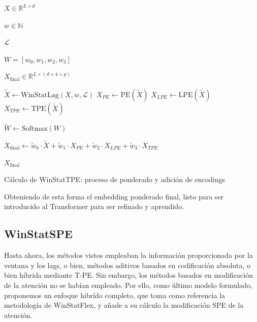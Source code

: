 \begin{algorithm}[H]
	\begin{algorithmic}[1]
		\Require
		
		$X \in \mathbb{R}^{L \times d}$ 
		
		$w \in \mathbb{N}$ 
		
		$\mathcal{L}$ 
		
		$W = [w_0, w_1, w_2, w_3]$ 
		
		\Ensure 
		
		$X_{\text{final}} \in \mathbb{R}^{L \times (d + 4 + p)}$ 
		
		\State $\tilde{X} \gets \text{WinStatLag}(X, w, \mathcal{L})$ 
		\State $X_{PE} \gets \text{PE}(\tilde{X})$ 
		\State $X_{LPE} \gets \text{LPE}(\tilde{X})$ 
		\State $X_{TPE} \gets \text{TPE}(\tilde{X})$ 
		
		\State $\tilde{W} \gets \mathrm{Softmax}(W)$ 
		
		\State $X_{\text{final}} \gets \tilde{w}_0 \cdot \tilde{X} + \tilde{w}_1 \cdot X_{PE} + \tilde{w}_2 \cdot X_{LPE} + \tilde{w}_3 \cdot X_{TPE}$
		
		\State \Return $X_{\text{final}}$
	\end{algorithmic}
	\caption{Cálculo de WinStatTPE: proceso de ponderado y adición de encodings}
	\label{winstattpe}
\end{algorithm}


Obteniendo de esta forma el embedding ponderado final, listo para ser introducido al Transformer para ser refinado y aprendido.


\subsection{WinStatSPE}

Hasta ahora, los métodos vistos empleaban la información proporcionada por la ventana y los lags, o bien, métodos aditivos basados en codificación absoluta, o bien híbrida mediante T-PE. Sin embargo, los métodos basados en modificación de la atención no se habían empleado. Por ello, como último modelo formulado, proponemos un enfoque hibrído completo, que toma como referencia la metodología de WinStatFlex, y añade a su cálculo la modificación SPE de la atención.

